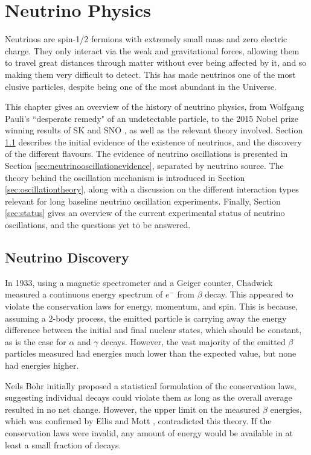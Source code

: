 \chapter{Neutrino Physics}\label{sec:NeutrinoPhysics}

Neutrinos are spin-1/2 fermions with extremely small mass and zero electric charge. They only interact via the weak and gravitational forces, allowing them to travel great distances through matter without ever being affected by it, and so making them very difficult to detect. This has made neutrinos one of the most elusive particles, despite being one of the most abundant in the Universe. 

This chapter gives an overview of the history of neutrino physics, from Wolfgang Pauli's ``desperate remedy" of an undetectable particle, to the 2015 Nobel prize winning results of SK \cite{FUKUDA2002179} and SNO \cite{Ahmad_2001}, as well as the relevant theory involved. Section \ref{sec:discovery} describes the initial evidence of the existence of neutrinos, and the discovery of the different flavours. The evidence of neutrino oscillations is presented in Section \ref{sec:neutrinooscillationevidence}, separated by neutrino source. The theory behind the oscillation mechanism is introduced in Section \ref{sec:oscillationtheory}, along with a discussion on the different interaction types relevant for long baseline neutrino oscillation experiments. Finally, Section \ref{sec:status} gives an overview of the current experimental status of neutrino oscillations, and the questions yet to be answered.

\section{Neutrino Discovery}\label{sec:discovery}

In 1933, using a magnetic spectrometer and a Geiger counter, Chadwick \cite{chadwick} measured a continuous energy spectrum of $e^-$ from $\beta$ decay. This appeared to violate the conservation laws for energy, momentum, and spin. This is because, assuming a 2-body process, the emitted particle is carrying away the energy difference between the initial and final nuclear states, which should be constant, as is the case for $\alpha$ and $\gamma$ decays. However, the vast majority of the emitted $\beta$ particles measured had energies much lower than the expected value, but none had energies higher.

Neils Bohr initially proposed a statistical formulation of the conservation laws, suggesting individual decays could violate them as long as the overall average resulted in no net change. However, the upper limit on the measured $\beta$ energies, which was confirmed by Ellis and Mott \cite{bethe1934neutrino}, contradicted this theory. If the conservation laws were invalid, any amount of energy would be available in at least a small fraction of decays.


